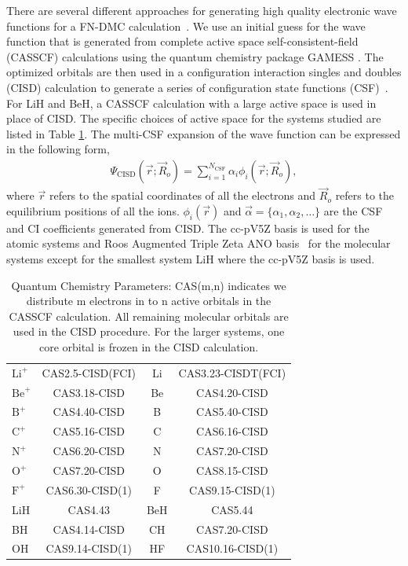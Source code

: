 \documentclass[pra,superscriptaddress,groupedaddress,twocolumn]{revtex4}
\begin{document}
There are several different approaches for generating high quality electronic wave functions for a FN-DMC calculation~\cite{Umrigar_Alleviation,Toulouse_Bench,Brown_Bench,Seth_Bench}. We use an initial guess for the wave function that is generated from complete active space self-consistent-field (CASSCF) \cite{Chaban_MCSCF,Szabo} calculations using the quantum chemistry package GAMESS \cite{GAMESS}. The optimized orbitals are then used in a configuration interaction singles and doubles (CISD) calculation to generate a series of configuration state functions (CSF)~\cite{Clark_Bench}. For LiH and BeH, a CASSCF calculation with a large active space is used in place of CISD. The specific choices of active space for the systems studied are listed in Table \ref{tab:CAS}. The multi-CSF expansion of the wave function can be expressed in the following form,
\begin{align}
\Psi_{\text{CISD}}(\vec{r};\vec{R}_o)=\sum\limits_{i=1}^{N_{\text{CSF}}}\alpha_i\phi_i(\vec{r};\vec{R}_o), \label{eq:psi_gms}
\end{align}
where $\vec{r}$ refers to the spatial coordinates of all the electrons and $\vec{R}_o$ refers to the equilibrium positions of all the ions. $\phi_i(\vec{r})$ and $\vec{\alpha}=\{\alpha_1,\alpha_2,\dots\}$ are the CSF and CI coefficients generated from CISD. The cc-pV5Z basis \cite{dunning} is used for the atomic systems and Roos Augmented Triple Zeta ANO basis~\cite{roos} for the molecular systems except for the smallest system LiH where the cc-pV5Z basis is used.

\begin{table}
\caption{Quantum Chemistry Parameters: CAS(m,n) indicates we distribute m electrons in to n active orbitals in the CASSCF calculation. All remaining molecular orbitals are used in the CISD procedure. For the larger systems, one core orbital is frozen in the CISD calculation.\label{tab:CAS}}
\begin{tabular}{lc|cc} \hline\hline
$\text{Li}^+$ & CAS2.5-CISD(FCI) & Li & CAS3.23-CISDT(FCI) \\ 
$\text{Be}^+$ & CAS3.18-CISD & Be & CAS4.20-CISD \\ 
$\text{B}^+$ & CAS4.40-CISD & B & CAS5.40-CISD \\
$\text{C}^+$ & CAS5.16-CISD & C & CAS6.16-CISD \\
$\text{N}^+$ & CAS6.20-CISD & N & CAS7.20-CISD \\
$\text{O}^+$ & CAS7.20-CISD & O & CAS8.15-CISD \\
$\text{F}^+$ & CAS6.30-CISD(1) & F & CAS9.15-CISD(1) \\ \hline
LiH & CAS4.43 & BeH & CAS5.44 \\ 
BH & CAS4.14-CISD & CH & CAS7.20-CISD \\ 
OH & CAS9.14-CISD(1) & HF & CAS10.16-CISD(1) \\ \hline \hline
\end{tabular}
\end{table}
\end{document}
